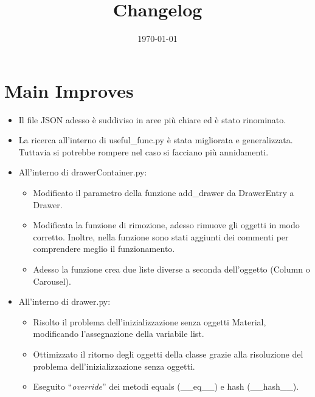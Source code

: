 \documentclass[a4paper]{article}
\newcommand{\dquotes}[1]{``#1''}
\begin{document}
	\title{Changelog}
	\date{\today}
	\maketitle
	
	\newpage
	
	\section*{Main Improves}
	
	\begin{itemize}[label=]
		\item Il file \textsf{JSON} adesso è suddiviso in aree più chiare ed è stato rinominato.
		
		\item La ricerca all'interno di \textsf{useful\_func.py} è stata migliorata e generalizzata. Tuttavia si potrebbe rompere nel caso si facciano più annidamenti.
		
		\item All'interno di \textsf{drawerContainer.py}:
			\begin{itemize}
				\item Modificato il parametro della funzione add\_drawer da \textsf{DrawerEntry} a \textsf{Drawer}.
				
				\item Modificata la funzione di rimozione, adesso rimuove gli oggetti in modo corretto. Inoltre, nella funzione sono stati aggiunti dei commenti per comprendere meglio il funzionamento.
				
				\item Adesso la funzione crea due liste diverse a seconda dell'oggetto (\textsf{Column} o \textsf{Carousel}).
			\end{itemize}
		
		\item All'interno di \textsf{drawer.py}:
			\begin{itemize}
				\item Risolto il problema dell'inizializzazione senza oggetti \textsf{Material}, modificando l'assegnazione della variabile \textsf{list}.
				
				\item Ottimizzato il ritorno degli oggetti della classe grazie alla risoluzione del problema dell'inizializzazione senza oggetti.
				
				\item Eseguito \dquotes{\emph{override}} dei metodi \textsf{equals (\_\_eq\_\_)} e \textsf{hash (\_\_hash\_\_)}.
			\end{itemize}
		

\end{itemize}
\end{document}
